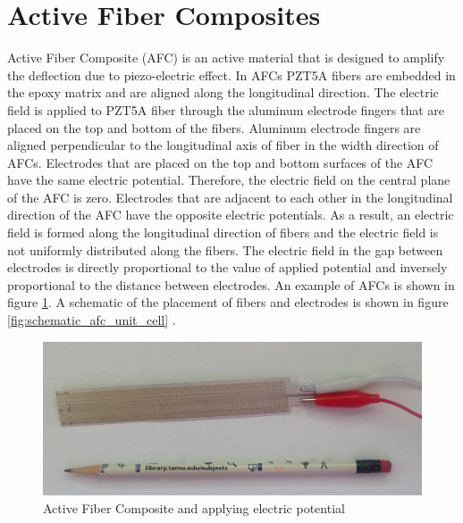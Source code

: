 

\section{Active Fiber Composites}
Active Fiber Composite (AFC) is an active material that is designed to amplify the deflection due to piezo-electric effect. In AFCs PZT5A fibers are embedded in the epoxy matrix and are aligned along the longitudinal direction. The electric field is applied to PZT5A fiber through the aluminum electrode fingers that are placed on the top and bottom of the fibers. Aluminum electrode fingers are aligned perpendicular to the longitudinal axis of fiber in the width direction of AFCs. Electrodes that are placed on the top and bottom surfaces of the AFC have the same electric potential. Therefore, the electric field on the central plane of the AFC is zero. Electrodes that are adjacent to each other in the longitudinal direction of the AFC have the opposite electric potentials. As a result, an electric field is formed along the longitudinal direction of fibers and the electric field is not uniformly distributed along the fibers. The electric field in the gap between electrodes is directly proportional to the value of applied potential and inversely proportional to the distance between electrodes. An example of AFCs is shown in figure \ref{fig:afc_picture_from_lap}.
A schematic of the placement of fibers and electrodes is shown in figure \ref{fig:schematic_afc_unit_cell} \cite{jemai2014mathematical}.


\begin{figure} 
\centering
\includegraphics[width=6.0in]{./chap_4_structural_analyses/afc_unit_cell/afc_picture_from_lap.png}
\caption{Active Fiber Composite and applying electric potential}
\label{fig:afc_picture_from_lap}
\end{figure}

